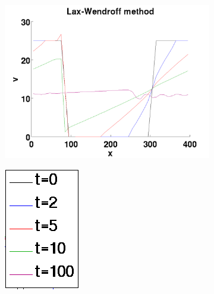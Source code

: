 \begin{figure}[h!]
\begin{subfigure}{.25\textwidth}
	\caption{}
	\label{fig:exc2_LW_F}
\end{subfigure}
\begin{subfigure}{.25\textwidth}
	\centering
	\includegraphics[width=\textwidth]{img/exc2_LW_v}
	\caption{}
	\label{fig:exc2_LW_v}
\end{subfigure}
\begin{subfigure}{.09\textwidth}
	\centering
	\includegraphics[width=\textwidth]{img/exc2_legend}

\end{subfigure}
\end{figure}
